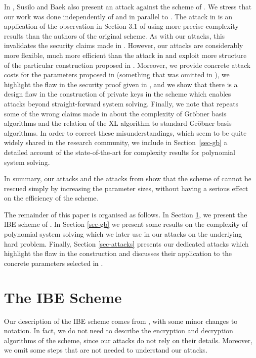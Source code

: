 \documentclass{llncs}
\begin{document}
In \cite{susilo-baek:asiaccs2011}, Susilo and Baek also present an attack against the scheme of \cite{CCGHC10}. We stress that our work was done independently of and in parallel to \cite{susilo-baek:asiaccs2011}. The attack in \cite{susilo-baek:asiaccs2011} is an application of the observation in Section 3.1 of \cite{CCGHC10} using more precise complexity results than the authors of the original scheme. As with our attacks, this invalidates the security claims made in \cite{CCGHC10}. However, our attacks are considerably more flexible, much more efficient than the attack in \cite{susilo-baek:asiaccs2011} and exploit more structure of the particular construction proposed in \cite{CCGHC10}. Moreover, we provide concrete attack costs for the parameters proposed in \cite{CCGHC10} (something that was omitted in \cite{susilo-baek:asiaccs2011}), we highlight the flaw in the security proof given in \cite{CCGHC10}, and we show that there is a design flaw in the construction of private keys in the scheme which enables attacks beyond straight-forward system solving. Finally, we note that \cite{susilo-baek:asiaccs2011} repeats some of the wrong claims made in \cite{CCGHC10} about the complexity of Gr\"{o}bner basis algorithms and the relation of the XL algorithm to standard Gr\"{o}bner basis algorithms. In order to correct these misunderstandings, which seem to be quite widely shared in the research community, we include in Section~\ref{sec-gb} a detailed account of the state-of-the-art for complexity results for polynomial system solving.

In summary, our attacks and the attacks from \cite{susilo-baek:asiaccs2011} show that the scheme of \cite{CCGHC10} cannot be rescued simply by increasing the parameter sizes, without having a serious effect on the efficiency of the scheme.

The remainder of this paper is organised as follows. In Section \ref{sec-scheme}, we present the IBE scheme of \cite{CCGHC10}. In Section \ref{sec-gb} we present some results on the complexity of polynomial system solving which we later use in our attacks on the underlying hard problem. Finally, Section \ref{sec-attacks} presents our dedicated attacks which highlight the flaw in the construction and discusses their application to the concrete parameters selected in \cite{CCGHC10}.

\section{The IBE Scheme}\label{sec-scheme}
Our description of the IBE scheme comes from \cite[Section 3]{CCGHC10}, with some minor changes to notation. In fact, we do not need to describe the encryption and decryption algorithms of the scheme, since our attacks do not rely on their details. Moreover, we omit some steps that are not needed to understand our attacks.
\end{document}

